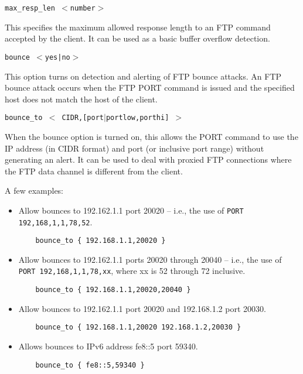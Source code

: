 \documentclass[english]{report}
\newcounter{slistnum}
\newenvironment{slist}
{ \begin{list}{ {\bf \arabic{slistnum}.} }{\usecounter{slistnum} } }
{ \end{list} }
\begin{document}
\begin{slist}
\item \texttt{max\_resp\_len $<$number$>$}

This specifies the maximum allowed response length to an FTP command accepted
by the client.  It can be used as a basic buffer overflow detection.

\item \texttt{bounce $<$yes|no$>$}

This option turns on detection and alerting of FTP bounce attacks.  An FTP
bounce attack occurs when the FTP PORT command is issued and the specified host
does not match the host of the client.

\item \texttt{bounce\_to $<$ CIDR,[port$|$portlow,porthi] $>$}

When the bounce option is turned on, this allows the PORT command to use the IP
address (in CIDR format) and port (or inclusive port range) without generating
an alert.  It can be used to deal with proxied FTP connections where the FTP
data channel is different from the client.

A few examples:

\begin{itemize}
\item Allow bounces to 192.162.1.1 port 20020 -- i.e., the use of
\texttt{PORT 192,168,1,1,78,52}.

\begin{verbatim}
    bounce_to { 192.168.1.1,20020 }
\end{verbatim}

\item Allow bounces to 192.162.1.1 ports 20020 through 20040 -- i.e., the use of
\texttt{PORT 192,168,1,1,78,xx}, where xx is 52 through 72 inclusive.

\begin{verbatim}
    bounce_to { 192.168.1.1,20020,20040 }
\end{verbatim}

\item Allow bounces to 192.162.1.1 port 20020 and 192.168.1.2 port 20030.

\begin{verbatim}
    bounce_to { 192.168.1.1,20020 192.168.1.2,20030 }
\end{verbatim}

\item Allows bounces to IPv6 address fe8::5 port 59340.  

\begin{verbatim}
    bounce_to { fe8::5,59340 }
\end{verbatim}



\end{itemize}
\end{slist}
\end{document}
